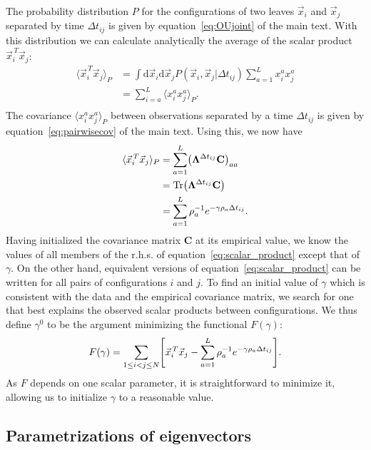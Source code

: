 \documentclass[preprint,amsmath,amssymb,superscriptaddress,showpacs,pre]{revtex4-1}
\let\originalleft\left
\let\originalright\right
\renewcommand{\left}{\mathopen{}\mathclose\bgroup\originalleft}
\renewcommand{\right}{\aftergroup\egroup\originalright}
\def\vx{\vec x}
\DeclareMathOperator{\Tr}{Tr}
\newcommand{\ddroit}{\textrm{d}}
\newcommand{\Lam}{\bm{\Lambda}}
\begin{document}
	The probability distribution $P$ for the configurations of two leaves $\vx_i$ and  $\vx_j$  separated by time $\Delta t_{ij}$ is given by equation~\ref{eq:OUjoint} of the main text. 
	With this distribution we can calculate analytically the average of the scalar product $\vx_i^{\,T}\vx_j$:
	\begin{align*}
		\langle \vx_i^{\,T}\vx_j \rangle_P &= \int \ddroit \vx_i \ddroit \vx_j P(\vx_i,\vx_j|\Delta t_{ij}) \sum_{a=1}^L   x_i^{a}x_j^{a}  \\
		&=\sum_{i=a}^L \langle  x_i^{a} x_j^a \rangle_{P}.\\
	\end{align*}
	The covariance $\langle  x_i^{a} x_j^a \rangle_{P}$ between observations separated by a time $\Delta t_{ij}$ is given by equation~\ref{eq:pairwisecov} of the main text.
	Using this, we now have
	\begin{align}
		\nonumber\langle \vx_i^{\,T}\vx_j \rangle_P &= \sum_{a=1}^L \left( \Lam^{\Delta t_{ij}} \mathbf{C} \right)_{aa}\\
		\nonumber&= \Tr\left( \Lam^{\Delta t_{ij}} \mathbf{C} \right)\\
		&= \sum_{a=1}^L \rho_a^{-1}e^{-\gamma\rho_a\Delta t_{ij}}.
		\label{eq:scalar_product}
	\end{align}
	Having initialized the covariance matrix $\mathbf{C}$ at its empirical value, we know the values of all members of the r.h.s. of equation~\ref{eq:scalar_product} except that of $\gamma$. 
	On the other hand, equivalent versions of equation~\ref{eq:scalar_product} can be written for all pairs of configurations $i$ and $j$. 
	To find an initial value of $\gamma$ which is consistent with the data and the empirical covariance matrix, we search for one that best explains the observed scalar products between configurations. 
	We thus define $\gamma^0$ to be the argument minimizing the functional $F(\gamma)$: 
	\begin{equation}
	 	F(\gamma) = \sum_{1\leq i<j\leq N}\left[ \vx_i^{\,T}\vx_j - \sum_{a=1}^L \rho_a^{-1}e^{-\gamma\rho_a\Delta t_{ij}} \right].
	\end{equation} 
	As $F$ depends on one scalar parameter, it is straightforward to minimize it, allowing us to initialize $\gamma$ to a reasonable value.




\subsection{Parametrizations of  eigenvectors } %
\label{sub:parametrizations_of_eigenvectors}
\end{document}
